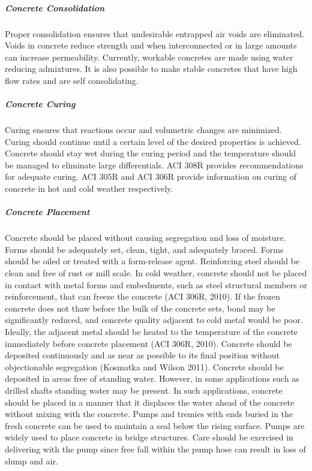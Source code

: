 \subparagraph{Concrete Consolidation}
Proper consolidation ensures that undesirable entrapped air voids are eliminated. Voids in concrete reduce strength and when interconnected or in large amounts can increase permeability. Currently, workable concretes are made using water reducing admixtures. It is also possible to make stable concretes that have high flow rates and are self consolidating.

\subparagraph{Concrete Curing}

Curing ensures that reactions occur and volumetric changes are minimized. Curing should continue until a certain level of the desired properties is achieved. Concrete should stay wet during the curing period and the temperature should be managed to eliminate large differentials. ACI 308R provides recommendations for adequate curing. ACI 305R and ACI 306R provide information on curing of concrete in hot and cold weather respectively.

\subparagraph{Concrete Placement}
Concrete should be placed without causing segregation and loss of moisture. Forms should be adequately set,
clean, tight, and adequately braced. Forms should be oiled or treated with a form-release agent. Reinforcing steel
should be clean and free of rust or mill scale. In cold weather, concrete should not be placed in contact with metal
forms and embedments, such as steel structural members or reinforcement, that can freeze the concrete (ACI 306R,
2010). If the frozen concrete does not thaw before the bulk of the concrete sets, bond may be significantly reduced,
and concrete quality adjacent to cold metal would be poor. Ideally, the adjacent metal should be heated to the
temperature of the concrete immediately before concrete placement (ACI 306R, 2010). Concrete should be deposited
continuously and as near as possible to its final position without objectionable segregation (Kosmatka and Wilson
2011). Concrete should be deposited in areas free of standing water. However, in some applications such as drilled shafts standing water may be present. In such applications, concrete should be placed in a manner that it displaces the water ahead of the concrete without mixing with the concrete. Pumps and tremies with ends buried in the fresh concrete can be used to maintain a seal below the rising surface. Pumps are widely used to place concrete in bridge structures. Care should be exercised in delivering with the pump since free fall within the pump hose can result in loss of slump and air.


